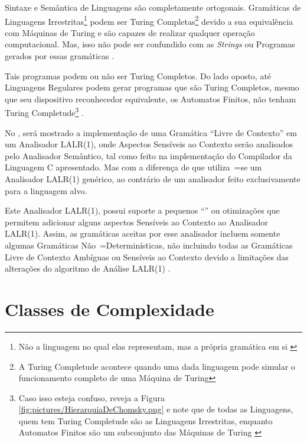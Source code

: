 {    Sintaxe e
    Semântica de Linguagens são completamente ortogonais.
    Gramáticas de Linguagens Irrestritas\footnote{
    Não a linguagem no qual elas representam,
    mas a própria gramática em si \cite{finiteAutomataTuringComplete}
    }
    podem ser Turing Completas\footnote{
    A Turing Completude acontece quando uma dada linguagem pode simular o funcionamento completo de uma Máquina de Turing
    }
    devido a sua equivalência com Máquinas de Turing e
    são capazes de realizar qualquer operação computacional.
    Mas,
    isso não pode ser confundido com as \textit{Strings} ou
    Programas gerados por essas gramáticas \cite{areThereDomainSpecificLanguages}.

    Tais programas podem ou
    não ser Turing Completos.
    Do lado oposto,
    até Linguagens Regulares podem gerar programas que são Turing Completos,
    mesmo que seu dispositivo reconhecedor equivalente,
    os Automatos Finitos,
    não tenham Turing Completude\footnote{
    Caso isso esteja confuso,
    reveja a Figura \ref{fig:pictures/HierarquiaDeChomsky.png} e
    note que de todas as Linguagens,
    quem tem Turing Completude são as Linguagens Irrestritas,
    enquanto Automatos Finitos são um subconjunto das Máquinas de Turing \cite{finiteAutomataTuringComplete}
    }
    \cite{turingCompleteRegularLanguages,finiteAutomataTuringComplete}.

    No ,
    será mostrado a implementação de uma Gramática ``Livre de Contexto'' em um Analisador LALR(1),
    onde Aspectos Sensíveis ao Contexto serão analisados pelo Analisador Semântico,
    tal como feito na implementação do Compilador da Linguagem C apresentado.
    Mas com a diferença de que utiliza~=se um Analisador LALR(1) genérico,
    ao contrário de um analisador feito exclusivamente para a linguagem alvo.

    Este Analisador LALR(1),
    possui suporte a pequenos ``\textit{}'' ou
    otimizações que permitem adicionar alguns aspectos Sensíveis ao Contexto ao Analisador LALR(1).
    Assim,
    as gramáticas aceitas por esse analisador incluem somente algumas Gramáticas Não~=Determinísticas,
    não incluindo todas as Gramáticas Livre de Contexto Ambíguas ou
    Sensíveis ao Contexto devido a limitações das alterações do algoritmo de Análise LALR(1) \cite{larkContextualLexer}.


\section{Classes de Complexidade}
\label{classesDeComplexidade}

}
